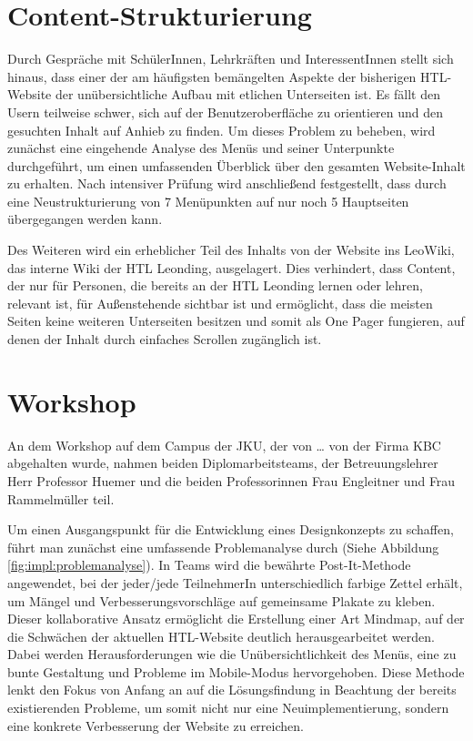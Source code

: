 \section{Content-Strukturierung}
Durch Gespräche mit SchülerInnen, Lehrkräften und InteressentInnen stellt sich hinaus, dass einer der am häufigsten bemängelten Aspekte der bisherigen 
HTL-Website der unübersichtliche Aufbau mit etlichen Unterseiten ist. Es fällt den Usern teilweise schwer, sich auf der Benutzeroberfläche zu orientieren 
und den gesuchten Inhalt auf Anhieb zu finden. Um dieses Problem zu beheben, wird zunächst eine eingehende Analyse des Menüs und seiner Unterpunkte durchgeführt, 
um einen umfassenden Überblick über den gesamten Website-Inhalt zu erhalten. Nach intensiver Prüfung wird anschließend festgestellt, dass durch eine Neustrukturierung von 
7 Menüpunkten auf nur noch 5 Hauptseiten übergegangen werden kann.

Des Weiteren wird ein erheblicher Teil des Inhalts von der Website ins LeoWiki, das interne Wiki der HTL Leonding, ausgelagert. 
Dies verhindert, dass Content, der nur für Personen, die bereits an der HTL Leonding lernen oder lehren, relevant ist, für Außenstehende sichtbar ist und ermöglicht, 
dass die meisten Seiten keine weiteren Unterseiten besitzen und somit als One Pager fungieren, auf denen der Inhalt durch einfaches Scrollen zugänglich ist.



\section{Workshop}
An dem Workshop auf dem Campus der JKU, der von … von der Firma KBC abgehalten wurde, nahmen beiden Diplomarbeitsteams, der Betreuungslehrer Herr Professor Huemer und die beiden Professorinnen 
Frau Engleitner und Frau Rammelmüller teil. 

Um einen Ausgangspunkt für die Entwicklung eines Designkonzepts zu schaffen, 
führt man zunächst eine umfassende Problemanalyse durch (Siehe Abbildung \ref{fig:impl:problemanalyse}). In Teams wird die bewährte Post-It-Methode angewendet, 
bei der jeder/jede TeilnehmerIn unterschiedlich farbige Zettel erhält, um Mängel und Verbesserungsvorschläge auf gemeinsame Plakate zu kleben. 
Dieser kollaborative Ansatz ermöglicht die Erstellung einer Art Mindmap, auf der die Schwächen der aktuellen HTL-Website deutlich herausgearbeitet werden. 
Dabei werden Herausforderungen wie die Unübersichtlichkeit des Menüs, eine zu bunte Gestaltung und Probleme im Mobile-Modus hervorgehoben. 
Diese Methode lenkt den Fokus von Anfang an auf die Lösungsfindung in Beachtung der bereits existierenden Probleme, um somit nicht nur eine Neuimplementierung, 
sondern eine konkrete Verbesserung der Website zu erreichen.

